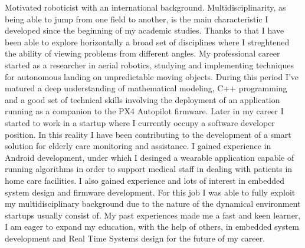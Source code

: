 

\begin{cvparagraph}
    Motivated roboticist with an international background. Multidisciplinarity, as being able to jump from one field to another, is the main characteristic I developed since the beginning of my academic studies.
    Thanks to that I have been able to explore horizontally a broad set of disciplines where I streghtened the ability of viewing problems from different angles. My professional career started as a researcher in aerial robotics, studying and implementing techniques for autonomous landing on unpredictable moving objects. 
    During this period I've matured a deep understanding of mathematical modeling, C++ programming and a good set of technical skills involving the deployment of an application running as a companion to the PX4 Autopilot firmware. 
    Later in my career I started to work in a startup where I currently occupy a software developer position. In this reality I have been contributing to the development of a smart solution for elderly care monitoring and assistance. I gained experience in Android development, under which I desinged a wearable application capable of running algorithms in order to support 
    medical staff in dealing with patients in home care facilities. I also gained experience and lots of interest in embedded system design and firmware development. For this job I was able to fully exploit my multidisciplinary background due to the nature of the dynamical environment startups usually consist of.
    My past experiences made me a fast and keen learner, I am eager to expand my education, with the help of others, in embedded system development and Real Time Systems design for the future of my career.
\end{cvparagraph}
